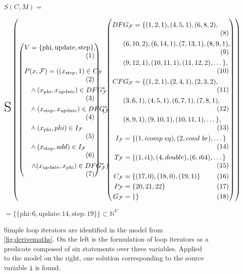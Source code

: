\begin{figure}[t]
\centering
{\huge $S\left(C,M\right)=$}
\vspace{0.5em}

$\text{\huge S}\left(\left(
\begin{minipage}{0.3\textwidth}
\setlength{\abovedisplayskip}{0pt}
\begin{align*}
    V=\{\text{phi}, \text{update}, \text{step}\},
\end{align*}
\begin{align*}
    P&(x,\mathcal F)=\left((x_\text{step},1)\in C_\mathcal{F}\right.\\
    &\land(x_\text{phi},x_\text{update})\in DFG_\mathcal{F}^*\\
    &\land(x_\text{step},x_\text{update})\in DFG_\mathcal{F}^*\\
    &\land(x_\text{phi}, phi)\in I_\mathcal{F}\\
    &\land(x_\text{step}, add)\in I_\mathcal{F}\\
    &\left.\land(x_\text{update},x_\text{phi})\in DFG_\mathcal{F}^*\right)
\end{align*}
\end{minipage}
\right)\text{\huge ,}\left(
\begin{minipage}{0.5\textwidth}
\setlength{\abovedisplayskip}{0pt}
\begin{align*}
DF&G_\mathcal F=\{(1,2,1),(4,5,1),(6,8,2),\\
&(6,10,2),(6,14,1),(7,13,1),(8,9,1),\\
&(9,12,1),(10,11,1),(11,12,2),\dots\},\\
CF&G_\mathcal F=\{(1,2,1),(2,4,1),(2,3,2),\\
&(3,6,1),(4,5,1),(6,7,1),(7,8,1),\\
&(8,9,1),(9,10,1),(10,11,1),\dots\},\\
I_\mathcal F&{}=\{(1,icomp\ eq),(2,cond\ br),\dots\}\\
T_\mathcal F&{}=\{(1,i1),(4,double),(6,i64),\dots\}\\
C_\mathcal F&{}=\{(17,0),(18,0),(19,1)\}\\
P_\mathcal F&{}=\{20,21,22\}\\
G_\mathcal F&{}=\{\}
\end{align*}
\end{minipage}
\right)\right)$

\vspace{0.5em}
{\huge$=\{\{\text{phi}:6,\text{update}:14,\text{step}:19\}\}\subset\mathbb N^V$}

\caption{Simple loop iterators are identified in the model from
         \autoref{fig:derivemaths}.
         On the left is the formulation of loop iterators as a predicate
         composed of six statements over three variables.
         Applied to the model on the right, one solution corresponding to
         the source variable {\tt i} is found.}
\label{fig:constraintsolution}
\end{figure}

